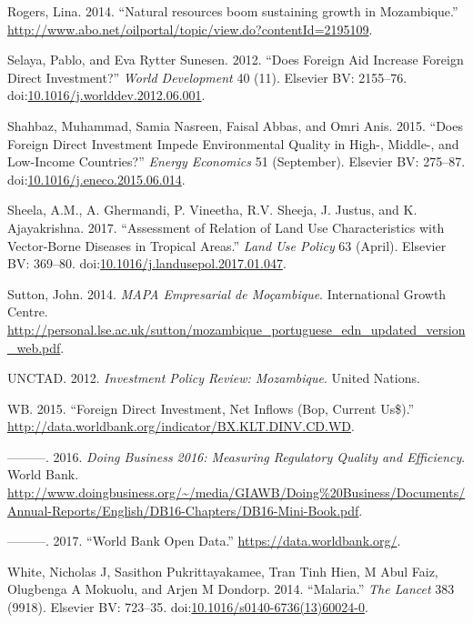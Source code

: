\documentclass[]{article}
\begin{document}
\hypertarget{ref-Rogers}{}
Rogers, Lina. 2014. ``Natural resources boom sustaining growth in
Mozambique.''
\url{http://www.abo.net/oilportal/topic/view.do?contentId=2195109}.

\hypertarget{ref-Selaya_2012}{}
Selaya, Pablo, and Eva Rytter Sunesen. 2012. ``Does Foreign Aid Increase
Foreign Direct Investment?'' \emph{World Development} 40 (11). Elsevier
BV: 2155--76.
doi:\href{https://doi.org/10.1016/j.worlddev.2012.06.001}{10.1016/j.worlddev.2012.06.001}.

\hypertarget{ref-Shahbaz_2015}{}
Shahbaz, Muhammad, Samia Nasreen, Faisal Abbas, and Omri Anis. 2015.
``Does Foreign Direct Investment Impede Environmental Quality in High-,
Middle-, and Low-Income Countries?'' \emph{Energy Economics} 51
(September). Elsevier BV: 275--87.
doi:\href{https://doi.org/10.1016/j.eneco.2015.06.014}{10.1016/j.eneco.2015.06.014}.

\hypertarget{ref-Sheela_2017}{}
Sheela, A.M., A. Ghermandi, P. Vineetha, R.V. Sheeja, J. Justus, and K.
Ajayakrishna. 2017. ``Assessment of Relation of Land Use Characteristics
with Vector-Borne Diseases in Tropical Areas.'' \emph{Land Use Policy}
63 (April). Elsevier BV: 369--80.
doi:\href{https://doi.org/10.1016/j.landusepol.2017.01.047}{10.1016/j.landusepol.2017.01.047}.

\hypertarget{ref-Sutton2014}{}
Sutton, John. 2014. \emph{MAPA Empresarial de Moçambique}. International
Growth Centre.
\url{http://personal.lse.ac.uk/sutton/mozambique_portuguese_edn_updated_version_web.pdf}.

\hypertarget{ref-Unctad2012}{}
UNCTAD. 2012. \emph{Investment Policy Review: Mozambique}. United
Nations.

\hypertarget{ref-wbdata}{}
WB. 2015. ``Foreign Direct Investment, Net Inflows (Bop, Current
Us\$).'' \url{http://data.worldbank.org/indicator/BX.KLT.DINV.CD.WD}.

\hypertarget{ref-doingbusiness}{}
---------. 2016. \emph{Doing Business 2016: Measuring Regulatory Quality
and Efficiency}. World Bank.
\url{http://www.doingbusiness.org/~/media/GIAWB/Doing\%20Business/Documents/Annual-Reports/English/DB16-Chapters/DB16-Mini-Book.pdf}.

\hypertarget{ref-wbd}{}
---------. 2017. ``World Bank Open Data.''
\url{https://data.worldbank.org/}.

\hypertarget{ref-White2014}{}
White, Nicholas J, Sasithon Pukrittayakamee, Tran Tinh Hien, M Abul
Faiz, Olugbenga A Mokuolu, and Arjen M Dondorp. 2014. ``Malaria.''
\emph{The Lancet} 383 (9918). Elsevier BV: 723--35.
doi:\href{https://doi.org/10.1016/s0140-6736(13)60024-0}{10.1016/s0140-6736(13)60024-0}.
\end{document}

